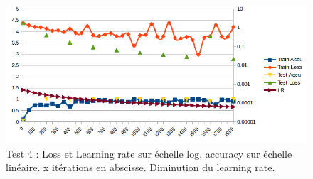 \documentclass[a4paper,12pt]{article}
\begin{document}
  \begin{figure}[!ht]
    \centering
    \includegraphics[keepaspectratio=true,width=430pt]{graphs/graph4.png}
    \centering
    \caption{Test 4 : Loss et Learning rate sur échelle log, accuracy sur échelle linéaire. x itérations en abscisse. Diminution du learning rate.}
  \end{figure}
\end{document}
